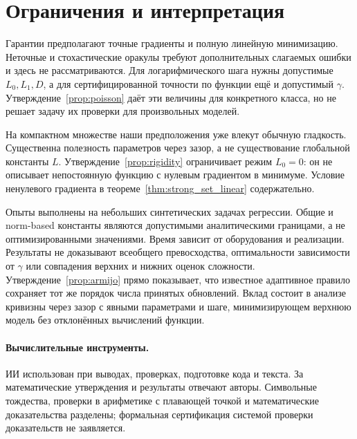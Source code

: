 \section{Ограничения и интерпретация}
Гарантии предполагают точные градиенты и полную линейную минимизацию.
Неточные и стохастические оракулы требуют дополнительных слагаемых
ошибки и здесь не рассматриваются. Для логарифмического шага нужны
допустимые $L_0,L_1,D$, а для сертифицированной точности по функции
ещё и допустимый $\gamma$. Утверждение~\ref{prop:poisson} даёт эти
величины для конкретного класса, но не решает задачу их проверки
для произвольных моделей.

На компактном множестве наши предположения уже влекут обычную
гладкость. Существенна полезность параметров через зазор, а не
существование глобальной константы $L$. Утверждение~\ref{prop:rigidity}
ограничивает режим $L_0=0$: он не описывает непостоянную функцию с
нулевым градиентом в минимуме. Условие ненулевого градиента в
теореме~\ref{thm:strong_set_linear} содержательно.

Опыты выполнены на небольших синтетических задачах регрессии.
Общие и norm-based константы являются допустимыми аналитическими
границами, а не оптимизированными значениями. Время зависит от
оборудования и реализации. Результаты не доказывают всеобщего
превосходства, оптимальности зависимости от $\gamma$ или совпадения
верхних и нижних оценок сложности. Утверждение~\ref{prop:armijo}
прямо показывает, что известное адаптивное правило сохраняет тот же
порядок числа принятых обновлений. Вклад состоит в анализе кривизны
через зазор с явными параметрами и шаге, минимизирующем верхнюю модель
без отклонённых вычислений функции.

\paragraph{Вычислительные инструменты.}
ИИ использован при выводах, проверках, подготовке кода и текста.
За математические утверждения и результаты отвечают авторы.
Символьные тождества, проверки в арифметике с плавающей точкой и
математические доказательства разделены; формальная сертификация
системой проверки доказательств не заявляется.
